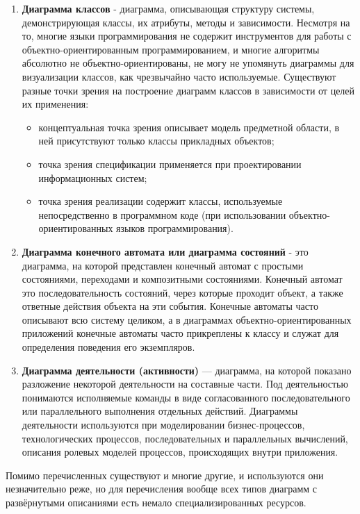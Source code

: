 \documentclass[fontsize=14bp]{report}
\begin{document}
\begin{enumerate}
    \item \textbf{Диаграмма классов} - диаграмма, описывающая структуру системы, демонстрирующая классы, их атрибуты, методы и зависимости. Несмотря на то, многие языки программирования не содержит инструментов для работы с объектно-ориентированным программированием, и многие алгоритмы абсолютно не объектно-ориентированы, не могу не упомянуть диаграммы для визуализации классов, как чрезвычайно часто используемые. Существуют разные точки зрения на построение диаграмм классов в зависимости от целей их применения: 
    \begin{itemize}
        \item концептуальная точка зрения описывает модель предметной области, в ней присутствуют только классы прикладных объектов; 
        \item точка зрения спецификации применяется при проектировании информационных систем; 
        \item точка зрения реализации содержит классы, используемые непосредственно в программном коде (при использовании объектно-ориентированных языков программирования).
    \end{itemize}
    \item \textbf{Диаграмма конечного автомата или диаграмма состояний} - это диаграмма, на которой представлен конечный автомат с простыми состояниями, переходами и композитными состояниями. Конечный автомат это последовательность состояний, через которые проходит объект, а также ответные действия объекта на эти события. Конечные автоматы часто описывают всю систему целиком, а в диаграммах объектно-ориентированных приложений конечные автоматы часто прикреплены к классу и служат для определения поведения его экземпляров.
    \item \textbf{Диаграмма деятельности (активности)} — диаграмма, на которой показано разложение некоторой деятельности на составные части. Под деятельностью понимаются исполняемые команды в виде согласованного последовательного или параллельного выполнения отдельных действий. Диаграммы деятельности используются при моделировании бизнес-процессов, технологических процессов, последовательных и параллельных вычислений, описания ролевых моделей процессов, происходящих внутри приложения.
\end{enumerate}
Помимо перечисленных существуют и многие другие, и используются они незначительно реже, но для перечисления вообще всех типов диаграмм с развёрнутыми описаниями есть немало специализированных ресурсов. 
\end{document}
